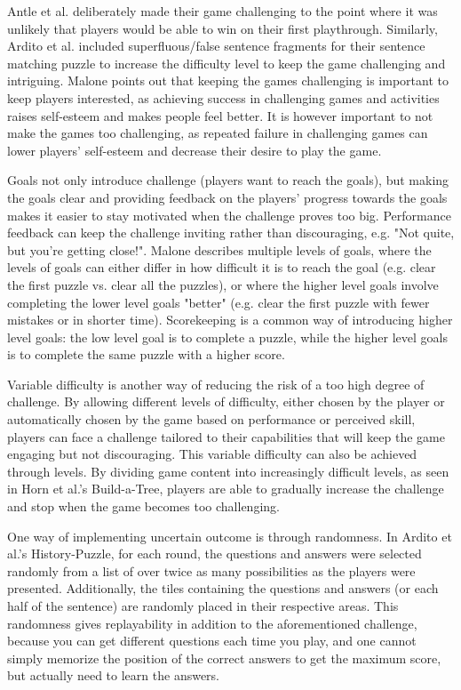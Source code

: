 Antle et al. deliberately made their game challenging to the point where it was unlikely that players would be able to win on their first playthrough. Similarly, Ardito et al. included superfluous/false sentence fragments for their sentence matching puzzle to increase the difficulty level to keep the game challenging and intriguing. Malone points out that keeping the games challenging is important to keep players interested, as achieving success in challenging games and activities raises self-esteem and makes people feel better. It is however important to not make the games too challenging, as repeated failure in challenging games can lower players' self-esteem and decrease their desire to play the game.

Goals not only introduce challenge (players want to reach the goals), but making the goals clear and providing feedback on the players' progress towards the goals makes it easier to stay motivated when the challenge proves too big. Performance feedback can keep the challenge inviting rather than discouraging, e.g. "Not quite, but you're getting close!". Malone describes multiple levels of goals, where the levels of goals can either differ in how difficult it is to reach the goal (e.g. clear the first puzzle vs. clear all the puzzles), or where the higher level goals involve completing the lower level goals "better" (e.g. clear the first puzzle with fewer mistakes or in shorter time). Scorekeeping is a common way of introducing higher level goals: the low level goal is to complete a puzzle, while the higher level goals is to complete the same puzzle with a higher score.

Variable difficulty is another way of reducing the risk of a too high degree of challenge. By allowing different levels of difficulty, either chosen by the player or automatically chosen by the game based on performance or perceived skill, players can face a challenge tailored to their capabilities that will keep the game engaging but not discouraging. This variable difficulty can also be achieved through levels. By dividing game content into increasingly difficult levels, as seen in Horn et al.'s Build-a-Tree, players are able to gradually increase the challenge and stop when the game becomes too challenging.

One way of implementing uncertain outcome is through randomness. In Ardito et al.'s History-Puzzle, for each round, the questions and answers were selected randomly from a list of over twice as many possibilities as the players were presented. Additionally, the tiles containing the questions and answers (or each half of the sentence) are randomly placed in their respective areas. This randomness gives replayability in addition to the aforementioned challenge, because you can get different questions each time you play, and one cannot simply memorize the position of the correct answers to get the maximum score, but actually need to learn the answers. 

